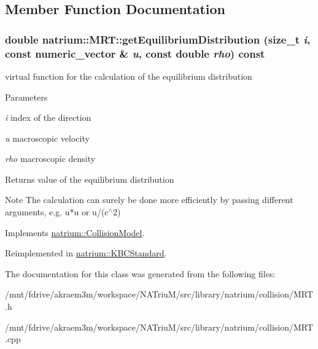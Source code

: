 \subsection{Member Function Documentation}
\hypertarget{classnatrium_1_1MRT_a3f96915f9f67680f4a1d7b952e70be55}{
\subsubsection[{getEquilibriumDistribution}]{\setlength{\rightskip}{0pt plus 5cm}double natrium::MRT::getEquilibriumDistribution (size\_\-t {\em i}, \/  const {\bf numeric\_\-vector} \& {\em u}, \/  const double {\em rho}) const}}
\label{classnatrium_1_1MRT_a3f96915f9f67680f4a1d7b952e70be55}


virtual function for the calculation of the equilibrium distribution 
\begin{DoxyParams}{Parameters}
\item[{\em i}]index of the direction \item[{\em u}]macroscopic velocity \item[{\em rho}]macroscopic density \end{DoxyParams}
\begin{DoxyReturn}{Returns}
value of the equilibrium distribution 
\end{DoxyReturn}
\begin{DoxyNote}{Note}
The calculation can surely be done more efficiently by passing different arguments, e.g. u$\ast$u or u/(c$^\wedge$2) 
\end{DoxyNote}


Implements \hyperlink{classnatrium_1_1CollisionModel_a88b382d63da80e950bc58e8afad769a6}{natrium::CollisionModel}.

Reimplemented in \hyperlink{classnatrium_1_1KBCStandard_a1dac2deaafb93027bf168887dd2e002d}{natrium::KBCStandard}.

The documentation for this class was generated from the following files:\begin{DoxyCompactItemize}
\item 
/mnt/fdrive/akraem3m/workspace/NATriuM/src/library/natrium/collision/MRT.h\item 
/mnt/fdrive/akraem3m/workspace/NATriuM/src/library/natrium/collision/MRT.cpp\end{DoxyCompactItemize}
